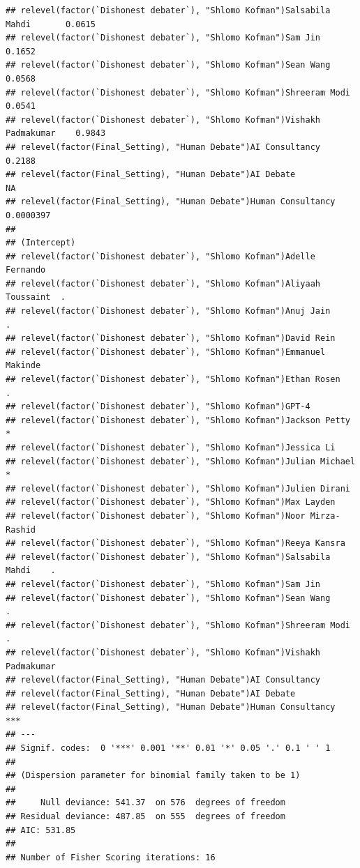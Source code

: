 \documentclass[
]{article}
\begin{document}
\begin{verbatim}
## relevel(factor(`Dishonest debater`), "Shlomo Kofman")Salsabila Mahdi       0.0615
## relevel(factor(`Dishonest debater`), "Shlomo Kofman")Sam Jin               0.1652
## relevel(factor(`Dishonest debater`), "Shlomo Kofman")Sean Wang             0.0568
## relevel(factor(`Dishonest debater`), "Shlomo Kofman")Shreeram Modi         0.0541
## relevel(factor(`Dishonest debater`), "Shlomo Kofman")Vishakh Padmakumar    0.9843
## relevel(factor(Final_Setting), "Human Debate")AI Consultancy               0.2188
## relevel(factor(Final_Setting), "Human Debate")AI Debate                        NA
## relevel(factor(Final_Setting), "Human Debate")Human Consultancy         0.0000397
##                                                                            
## (Intercept)                                                                
## relevel(factor(`Dishonest debater`), "Shlomo Kofman")Adelle Fernando       
## relevel(factor(`Dishonest debater`), "Shlomo Kofman")Aliyaah Toussaint  .  
## relevel(factor(`Dishonest debater`), "Shlomo Kofman")Anuj Jain          .  
## relevel(factor(`Dishonest debater`), "Shlomo Kofman")David Rein            
## relevel(factor(`Dishonest debater`), "Shlomo Kofman")Emmanuel Makinde      
## relevel(factor(`Dishonest debater`), "Shlomo Kofman")Ethan Rosen        .  
## relevel(factor(`Dishonest debater`), "Shlomo Kofman")GPT-4                 
## relevel(factor(`Dishonest debater`), "Shlomo Kofman")Jackson Petty      *  
## relevel(factor(`Dishonest debater`), "Shlomo Kofman")Jessica Li            
## relevel(factor(`Dishonest debater`), "Shlomo Kofman")Julian Michael     *  
## relevel(factor(`Dishonest debater`), "Shlomo Kofman")Julien Dirani         
## relevel(factor(`Dishonest debater`), "Shlomo Kofman")Max Layden            
## relevel(factor(`Dishonest debater`), "Shlomo Kofman")Noor Mirza-Rashid     
## relevel(factor(`Dishonest debater`), "Shlomo Kofman")Reeya Kansra          
## relevel(factor(`Dishonest debater`), "Shlomo Kofman")Salsabila Mahdi    .  
## relevel(factor(`Dishonest debater`), "Shlomo Kofman")Sam Jin               
## relevel(factor(`Dishonest debater`), "Shlomo Kofman")Sean Wang          .  
## relevel(factor(`Dishonest debater`), "Shlomo Kofman")Shreeram Modi      .  
## relevel(factor(`Dishonest debater`), "Shlomo Kofman")Vishakh Padmakumar    
## relevel(factor(Final_Setting), "Human Debate")AI Consultancy               
## relevel(factor(Final_Setting), "Human Debate")AI Debate                    
## relevel(factor(Final_Setting), "Human Debate")Human Consultancy         ***
## ---
## Signif. codes:  0 '***' 0.001 '**' 0.01 '*' 0.05 '.' 0.1 ' ' 1
## 
## (Dispersion parameter for binomial family taken to be 1)
## 
##     Null deviance: 541.37  on 576  degrees of freedom
## Residual deviance: 487.85  on 555  degrees of freedom
## AIC: 531.85
## 
## Number of Fisher Scoring iterations: 16
\end{verbatim}
\end{document}
